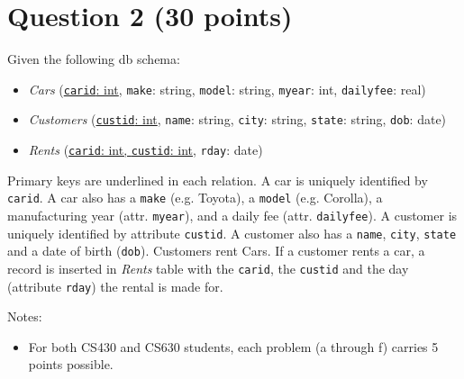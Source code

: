 \documentclass[letterpaper, 11pt]{article}
\begin{document}
\section*{Question 2 (30 points)}

Given the following db schema:
\begin{itemize}
    \item \textit{Cars} (\ul{\texttt{carid}: int}, \texttt{make}: string, \texttt{model}: string, \texttt{myear}: int, \texttt{dailyfee}: real)
    \item \textit{Customers} (\ul{\texttt{custid}: int}, \texttt{name}: string, \texttt{city}: string, \texttt{state}: string, \texttt{dob}: date)
    \item \textit{Rents} (\ul{\texttt{carid}: int, \texttt{custid}: int}, \texttt{rday}: date)
\end{itemize}

Primary keys are underlined in each relation. A car is uniquely identified by \texttt{carid}. A car also has a \texttt{make} (e.g. Toyota), a \texttt{model} (e.g. Corolla), a manufacturing year (attr. \texttt{myear}), and a daily fee (attr. \texttt{dailyfee}). A customer is uniquely identified by attribute \texttt{custid}. A customer also has a \texttt{name}, \texttt{city}, \texttt{state} and a date of birth (\texttt{dob}). Customers rent Cars. If a customer rents a car, a record is inserted in \textit{Rents} table with the \texttt{carid}, the \texttt{custid} and the day (attribute \texttt{rday}) the rental is made for.

Notes:
\begin{itemize}
    \item For both CS430 and CS630 students, each problem (a through f) carries 5 points possible.
\end{itemize}
\end{document}
